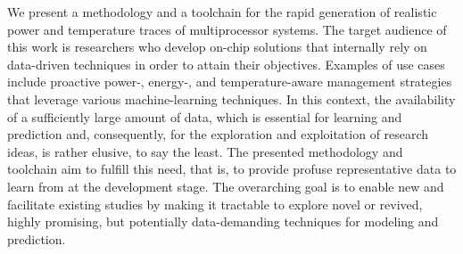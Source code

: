 We present a methodology and a toolchain for the rapid generation of realistic
power and temperature traces of multiprocessor systems. The target audience of
this work is researchers who develop on-chip solutions that internally rely on
data-driven techniques in order to attain their objectives. Examples of use
cases include proactive power-, energy-, and temperature-aware management
strategies that leverage various machine-learning techniques. In this context,
the availability of a sufficiently large amount of data, which is essential for
learning and prediction and, consequently, for the exploration and exploitation
of research ideas, is rather elusive, to say the least. The presented
methodology and toolchain aim to fulfill this need, that is, to provide profuse
representative data to learn from at the development stage. The overarching goal
is to enable new and facilitate existing studies by making it tractable to
explore novel or revived, highly promising, but potentially data-demanding
techniques for modeling and prediction.
